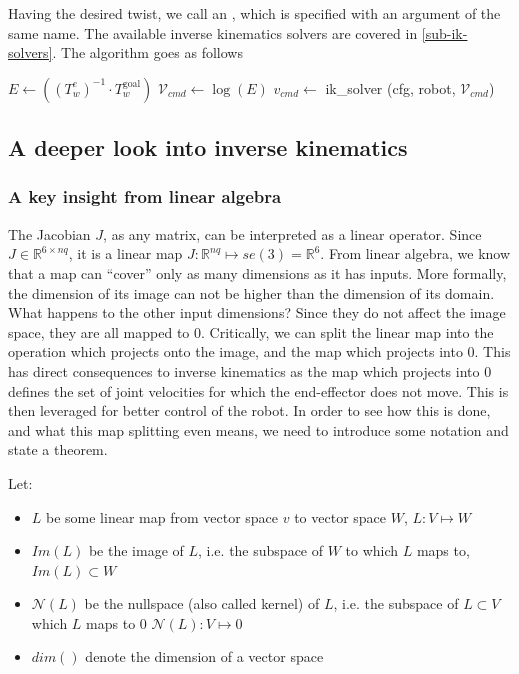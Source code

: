 Having the desired twist, we call an ,
which is specified with an argument of the same name.
The available inverse kinematics solvers are covered in 
\ref{sub-ik-solvers}.
The algorithm goes as follows

\begin{algorithm}[H]
\caption{moveL}
\begin{algorithmic}[1]
		\State $   E \gets \left( \left(T_{ w }^{ e }\right)^{ -1 } \cdot T_{ w }^{ \text{goal} }  \right) $
		\State $\mathcal{V}_{ cmd } \gets \log (E)$
		\State $v_{ cmd } \gets $ ik\_solver (cfg, robot, $ \mathcal{V}_{ cmd }  $)
		\EndWhile
		\EndProcedure
\end{algorithmic}
\end{algorithm}


\subsection{A deeper look into inverse kinematics}
\subsubsection{A key insight from linear algebra}
The Jacobian $J$, as any matrix, can be interpreted as a linear operator.
Since $J \in \mathbb{R}^{6 \times nq}$, it is a linear map 
$J: \mathbb{R}^{nq} \mapsto se(3) = \mathbb{R}^{6}$.
From linear algebra, we know that a map can ``cover'' only as many dimensions
as it has inputs. More formally, the dimension of its image can not be higher 
than the dimension of its domain.
What happens to the other input dimensions? Since they do not affect the image space,
they are all mapped to 0.
Critically, we can split the linear map into the operation which projects onto the image,
and the map which projects into 0. This has direct consequences to inverse kinematics
as the map which projects into 0 defines the set of joint velocities for which the end-effector does not move.
This is then leveraged for better control of the robot.
In order to see how this is done, and what this map splitting even means, we need to introduce
some notation and state a theorem.

Let:
\begin{itemize}
\item $L$ be some linear map from vector space $v$ to vector space $W$, $L: V \mapsto W$
\item $Im(L)$ be the image of $L$, i.e. the subspace of $W$ to which $L$ maps to, $Im(L) \subset W$
\item $\mathcal{N} (L)$ be the nullspace (also called kernel) of $L$, i.e. the subspace of $ L \subset V$ which $L$ maps to 0 $\mathcal{N}(L): V \mapsto 0 $
\item $dim()$ denote the dimension of a vector space
\end{itemize}

